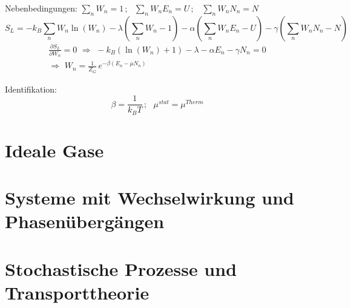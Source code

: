 \documentclass[a4paper,11pt]{scrartcl}
\begin{document}
Nebenbedingungen: $\sum_n W_n = 1\,;\,\,\,\, \sum_n W_n E_n = U\, ; \,\,\,\,\, \sum_n W_n N_n = N $
\begin{equation}
 S_L = -k_B \sum_n W_n \ln(W_n)- \lambda \left( \sum_n W_n -1 \right)-\alpha \left(\sum_n W_n E_n -U \right)- \gamma \left( \sum_n W_n N_n -N \right)
\end{equation}
\begin{equation}
  \begin{split}
    \frac{\partial S_L}{\partial W_n} = 0 \,\, \Rightarrow \,\, -k_B (\ln(W_n)+1) - \lambda- \alpha E_n - \gamma N_n =0\\
    \Rightarrow \,\, W_n = \frac{1}{Z_G} \, e^{- \beta (E_n - \mu N_n)}
  \end{split}
\end{equation}


Identifikation:\\
\begin{equation}
 \beta = \frac{1}{k_B T}\,; \,\,\,\, \mu^{stat} = \mu^{Therm}
\end{equation}



 








\section{Ideale Gase}
\section{Systeme mit Wechselwirkung und Phasenübergängen}
\section{Stochastische Prozesse und Transporttheorie}
\end{document}
